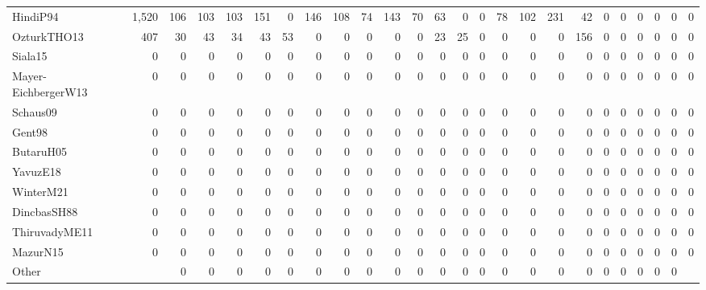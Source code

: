 \documentclass[a4paper]{article}
\begin{document}
\begin{table}[htbp]
{{\begin{tabular}{lr|*{22}{@{ }r@{ }}|r}
HindiP94 & 1,520&106&103&103&151&0&146&108&74&143&70&63&0&0&78&102&231&42&0&0&0&0&0& 0\\ 
OzturkTHO13 & 407&30&43&34&43&53&0&0&0&0&0&23&25&0&0&0&0&156&0&0&0&0&0& 0\\ 
Siala15 & 0&0&0&0&0&0&0&0&0&0&0&0&0&0&0&0&0&0&0&0&0&0&0& 0\\ 
Mayer-EichbergerW13 & 0&0&0&0&0&0&0&0&0&0&0&0&0&0&0&0&0&0&0&0&0&0&0& 0\\ 
Schaus09 & 0&0&0&0&0&0&0&0&0&0&0&0&0&0&0&0&0&0&0&0&0&0&0& 0\\ 
Gent98 & 0&0&0&0&0&0&0&0&0&0&0&0&0&0&0&0&0&0&0&0&0&0&0& 0\\ 
ButaruH05 & 0&0&0&0&0&0&0&0&0&0&0&0&0&0&0&0&0&0&0&0&0&0&0& 0\\ 
YavuzE18 & 0&0&0&0&0&0&0&0&0&0&0&0&0&0&0&0&0&0&0&0&0&0&0& 0\\ 
WinterM21 & 0&0&0&0&0&0&0&0&0&0&0&0&0&0&0&0&0&0&0&0&0&0&0& 0\\ 
DincbasSH88 & 0&0&0&0&0&0&0&0&0&0&0&0&0&0&0&0&0&0&0&0&0&0&0& 0\\ 
ThiruvadyME11 & 0&0&0&0&0&0&0&0&0&0&0&0&0&0&0&0&0&0&0&0&0&0&0& 0\\ 
MazurN15 & 0&0&0&0&0&0&0&0&0&0&0&0&0&0&0&0&0&0&0&0&0&0&0& 0\\ 
\midrule
Other & & 0& 0& 0& 0& 0& 0& 0& 0& 0& 0& 0& 0& 0& 0& 0& 0& 0& 0& 0& 0& 0& 0\\ 
\bottomrule
\end{tabular}
}
}
\end{table}
\end{document}
